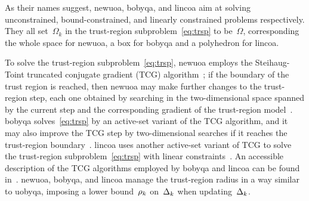 \documentclass[
    smallextended,  %
    final,          %
]{svjour3}
\newcommand{\fsetm}[1][k]{\Omega_{#1}}
\newcommand{\fset}{\Omega}
\newcommand{\rad}[1][k]{\Delta\ifthenelse{\equal{#1}{}}{}{_{#1}}}
\newcommand{\radlb}[1][k]{\rho\ifthenelse{\equal{#1}{}}{}{_{#1}}}
\begin{document}
As their names suggest, \gls{newuoa}, \gls{bobyqa}, and \gls{lincoa} aim at solving unconstrained,
bound-constrained, and linearly constrained problems respectively.
They all set~$\fsetm$ in the trust-region subproblem~\eqref{eq:trsp} to be~$\fset$, corresponding the whole space for \gls{newuoa}, a box for \gls{bobyqa} and a polyhedron for \gls{lincoa}.

To solve the trust-region subproblem~\eqref{eq:trsp}, \gls{newuoa} employs the
Steihaug-Toint truncated conjugate gradient (TCG) algorithm~\cite{Steihaug_1983,Toint_1981};
if the boundary of the trust region is reached, then \gls{newuoa} may make further
changes to the trust-region step, each one obtained by searching in the two-dimensional space
spanned by the current step and the corresponding gradient of the trust-region model~\cite[\S~5]{Powell_2006}.
\gls{bobyqa} solves~\eqref{eq:trsp} by an active-set variant of the TCG algorithm, and
it may also improve the TCG step by two-dimensional searches if it reaches the
trust-region boundary~\mbox{\cite[\S~3]{Powell_2009}}.
\gls{lincoa} uses another active-set variant of TCG to solve the trust-region
subproblem~\eqref{eq:trsp} with linear constraints~\cite[\S~3 and \S~5]{Powell_2015}.
An accessible description of the TCG algorithms employed by \gls{bobyqa} and \gls{lincoa}
can be found in~\cite[\S~6.2.1 and \S~6.2.2]{Ragonneau_2022}.
\gls{newuoa}, \gls{bobyqa}, and \gls{lincoa} manage the trust-region radius in a way similar to
\gls{uobyqa}, imposing a lower bound~$\radlb$ on~$\rad$ when updating~$\rad$.
\end{document}
